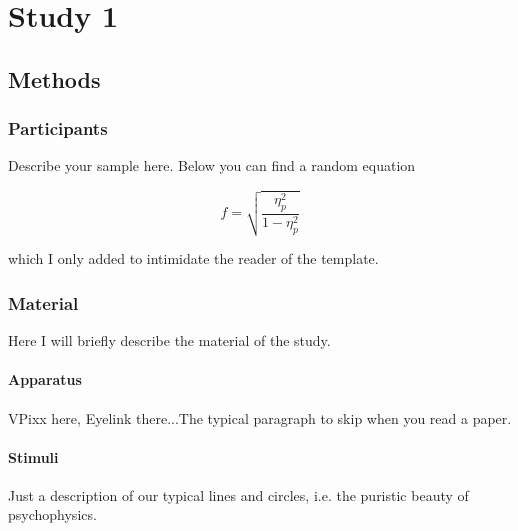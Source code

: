 \section{Study 1}

\subsection{Methods}

\subsubsection{Participants}

Describe your sample here. Below you can find a random equation

\begin{equation}
f = \sqrt{\frac{\eta_{p}^{2}}{1-\eta_{p}^{2}}}
\end{equation}

which I only added to intimidate the reader of the template.

\subsubsection{Material}

Here I will briefly describe the material of the study.

\paragraph{Apparatus}
VPixx here, Eyelink there...The typical paragraph to skip when you read a paper.


\paragraph{Stimuli}
Just a description of our typical lines and circles, i.e. the puristic beauty of psychophysics.
